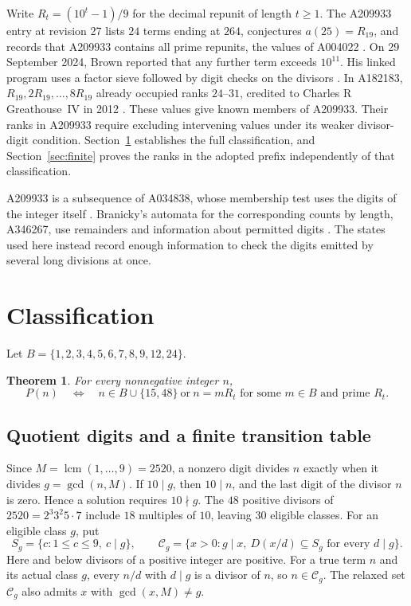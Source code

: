 \documentclass[11pt]{article}
\newtheorem{theorem}{Theorem}
\begin{document}
Write \(R_t=(10^t-1)/9\) for the decimal repunit of length \(t\ge 1\).
The A209933 entry at revision 27 lists \(24\) terms ending at \(264\),
conjectures \(a(25)=R_{19}\), and records that A209933 contains all
prime repunits, the values of A004022 \cite{oeis209933,oeis004022}.
On 29 September 2024, Brown reported that any further term exceeds
\(10^{11}\). His linked program uses a factor sieve followed by digit
checks on the divisors \cite{oeis209933,brown}. In A182183,
\(R_{19},2R_{19},\ldots,8R_{19}\) already occupied ranks \(24\)--\(31\),
credited to Charles R Greathouse~IV in 2012 \cite{oeis182183}.
These values give known members of A209933. Their ranks in A209933
require excluding intervening values under its weaker divisor-digit
condition. Section~\ref{sec:class} establishes the full classification,
and Section~\ref{sec:finite} proves the ranks in the adopted prefix
independently of that classification.

A209933 is a subsequence of A034838, whose membership test uses the
digits of the integer itself \cite{oeis209933,oeis034838}. Branicky's
automata for the corresponding counts by length, A346267, use
remainders and information about permitted digits \cite{oeis346267}.
The states used here instead record enough information to check the
digits emitted by several long divisions at once.

\section{Classification}\label{sec:class}

Let \(B=\{1,2,3,4,5,6,7,8,9,12,24\}\).

\begin{theorem}\label{thm:class}
For every nonnegative integer \(n\),
\[
 P(n)
 \quad\Longleftrightarrow\quad
 n\in B\cup\{15,48\}
 \ \text{or}\
 n=mR_t\text{ for some }m\in B\text{ and prime }R_t.
\]
\end{theorem}

\subsection{Quotient digits and a finite transition table}

Since \(M=\operatorname{lcm}(1,\ldots,9)=2520\), a nonzero digit divides
\(n\) exactly when it divides \(g=\gcd(n,M)\). If \(10\mid g\), then
\(10\mid n\), and the last digit of the divisor \(n\) is zero. Hence
a solution requires \(10\nmid g\). The \(48\) positive divisors of
\(2520=2^3 3^2 5\cdot7\) include \(18\) multiples of \(10\), leaving
\(30\) eligible classes. For an eligible class \(g\), put
\[
 S_g=\{c:1\le c\le9,\ c\mid g\},\qquad
 \mathcal C_g=\{x>0:g\mid x,\ D(x/d)\subseteq S_g\text{ for every }d\mid g\}.
\]
Here and below divisors of a positive integer are positive. For a true
term \(n\) and its actual class \(g\), every \(n/d\) with \(d\mid g\)
is a divisor of \(n\), so \(n\in\mathcal C_g\). The relaxed set
\(\mathcal C_g\) also admits \(x\) with \(\gcd(x,M)\ne g\).
\end{document}
